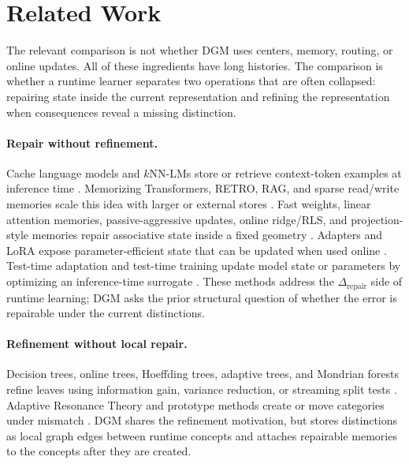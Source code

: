 \section{Related Work}
\label{sec:related}

The relevant comparison is not whether DGM uses centers, memory, routing, or online updates. All of these ingredients have long histories. The comparison is whether a runtime learner separates two operations that are often collapsed: repairing state inside the current representation and refining the representation when consequences reveal a missing distinction.

\paragraph{Repair without refinement.}
Cache language models and $k$NN-LMs store or retrieve context-token examples at inference time \citep{grave2017improving,khandelwal2020generalization}. Memorizing Transformers, RETRO, RAG, and sparse read/write memories scale this idea with larger or external stores \citep{wu2022memorizing,borgeaud2022improving,lewis2020retrieval,rae2016scaling}. Fast weights, linear attention memories, passive-aggressive updates, online ridge/RLS, and projection-style memories repair associative state inside a fixed geometry \citep{ba2016using,katharopoulos2020transformers,schlag2021linear,crammer2006online,vovk1997competitive,bregman1967relaxation,tikhonov1977solutions,hoerl1970ridge}. Adapters and LoRA expose parameter-efficient state that can be updated when used online \citep{houlsby2019parameter,hu2022lora}. Test-time adaptation and test-time training update model state or parameters by optimizing an inference-time surrogate \citep{sun2020test,wang2021tent,niu2022eata,zhang2022memo,sun2025learning}. These methods address the $\Delta_{\mathrm{repair}}$ side of runtime learning; DGM asks the prior structural question of whether the error is repairable under the current distinctions.

\paragraph{Refinement without local repair.}
Decision trees, online trees, Hoeffding trees, adaptive trees, and Mondrian forests refine leaves using information gain, variance reduction, or streaming split tests \citep{quinlan1986induction,breiman1984classification,domingos2000mining,bifet2009adaptive,manapragada2018extremely,lakshminarayanan2014mondrian}. Adaptive Resonance Theory and prototype methods create or move categories under mismatch \citep{carpenter1987massively,carpenter1987art2,grossberg2013adaptive,kohonen1990self,fritzke1995growing,snell2017prototypical}. DGM shares the refinement motivation, but stores distinctions as local graph edges between runtime concepts and attaches repairable memories to the concepts after they are created.


